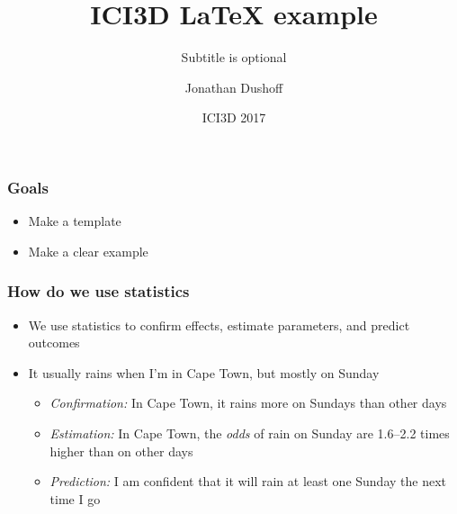 \documentclass{beamer}
\begin{document}
\title{ICI3D LaTeX example}
\subtitle{Subtitle is optional} %
\author{Jonathan Dushoff}
\date{ICI3D 2017} %
\newcommand{\years}{2017} %
\newcommand{\figshare}{https://figshare.com/articles/NAME/NUMBER}

{\topBar\maketitle}

\begin{frame}

\frametitle{Goals}

\begin{itemize}

\item Make a template

\item Make a clear example

\end{itemize}

\end{frame}
\begin{frame}

\frametitle{How do we use statistics}

\begin{itemize}

	\item We use statistics to confirm effects, estimate parameters, and
		predict outcomes

	\item It usually rains when I'm in Cape Town, but mostly on Sunday

	\begin{itemize}

		\item \emph{Confirmation:} In Cape Town, it rains more on Sundays than
				other days

		\item \emph{Estimation:} In Cape Town, the \emph{odds} of rain on
				Sunday are 1.6--2.2 times higher than on other days

		\item \emph{Prediction:} I am confident that it will rain at least one
				Sunday the next time I go

	\end{itemize}

\end{itemize}

\end{frame}
\end{document}
